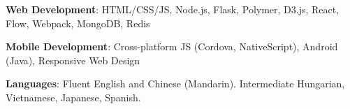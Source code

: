 \documentclass[margin,line]{resume}
\begin{document}
\begin{resume}

\vspace{-4mm}


\textbf{Web Development}: HTML/CSS/JS, Node.js, Flask, Polymer, D3.js, React, Flow, Webpack, MongoDB, Redis %

\vspace{-4mm}

\textbf{Mobile Development}: Cross-platform JS (Cordova, NativeScript), Android (Java), Responsive Web Design








\vspace{-4mm}

\textbf{Languages}: Fluent English and Chinese (Mandarin). Intermediate Hungarian, Vietnamese, Japanese, Spanish.

\pagebreak





\end{resume}
\end{document}
